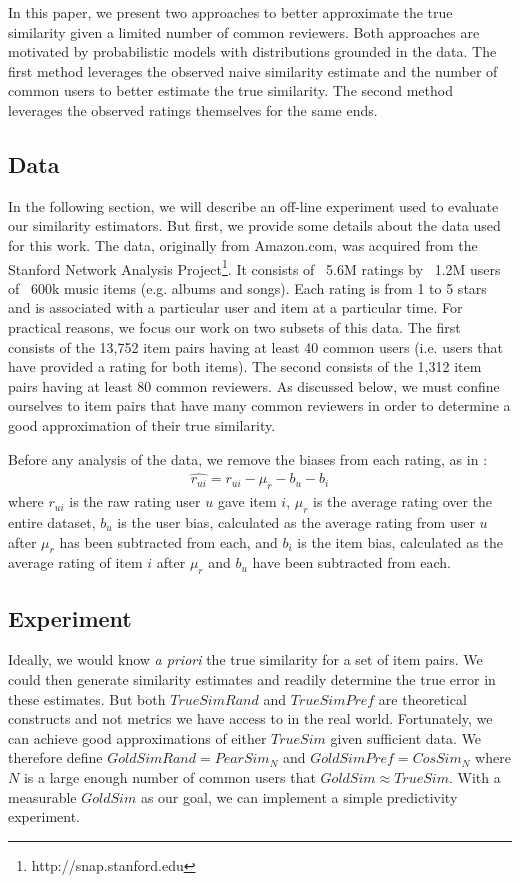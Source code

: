 \documentclass[11pt]{article}
\begin{document}
In this paper, we present two approaches to better approximate the
true similarity given a limited number of common reviewers. Both approaches are
motivated by probabilistic models with distributions grounded in the data. The
first method leverages the observed naive similarity estimate and the number of
common users to better estimate the true similarity. The second method leverages
the observed ratings themselves for the same ends.

\subsection*{Data}
In the following section, we will describe an off-line experiment used to
evaluate our similarity estimators. But first, we provide some details about the
data used for this work. The data, originally from Amazon.com, was acquired from
the Stanford Network Analysis Project\footnote{http://snap.stanford.edu}. It
consists of ~5.6M ratings by ~1.2M users of ~600k music items (e.g. albums and
songs). Each rating is from 1 to 5 stars and is associated with a particular
user and item at a particular time.  For practical reasons, we focus our work on
two subsets of this data. The first consists of the 13,752 item pairs having at
least 40 common users (i.e. users that have provided a rating for both items).
The second consists of the 1,312 item pairs having at least 80 common reviewers.
As discussed below, we must confine ourselves to item pairs that have many
common reviewers in order to determine a good approximation of their true
similarity.

Before any analysis of the data, we remove the biases from each rating, as in
\cite{Koren2009}:
\begin{align}
\hat{r_{ui}} = r_{ui} - \mu_r - b_u - b_i
\end{align}
where $r_{ui}$ is the raw rating user $u$ gave item $i$, $\mu_r$ is the average
rating over the entire dataset, $b_u$ is the user bias, calculated as the
average rating from user $u$ after $\mu_r$ has been subtracted from each, and
$b_i$ is the item bias, calculated as the average rating of item $i$ after
$\mu_r$ and $b_u$ have been subtracted from each. 

\subsection*{Experiment}
Ideally, we would know {\em a priori} the true similarity for a set of item
pairs. We could then generate similarity estimates and readily determine the
true error in these estimates. But both $TrueSimRand$ and $TrueSimPref$ are
theoretical constructs and not metrics we have access to in the real world.
Fortunately, we can achieve good approximations of either $TrueSim$ given
sufficient data. We therefore define $GoldSimRand = PearSim_N$ and $GoldSimPref =
CosSim_N$ where $N$ is a large enough number of common users that $GoldSim 
\approx TrueSim$.  With a measurable $GoldSim$ as our goal, we can implement 
a simple predictivity experiment.
\end{document}
